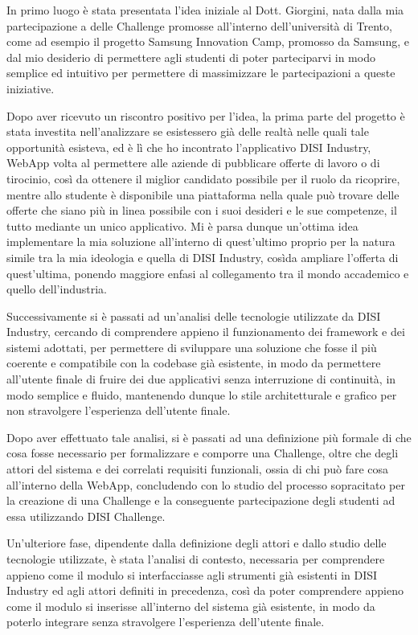 In primo luogo è stata presentata l'idea iniziale al Dott. Giorgini, nata dalla mia partecipazione a delle Challenge promosse all'interno dell'università di Trento, come ad esempio il progetto Samsung Innovation Camp, promosso da Samsung, e dal mio desiderio di permettere agli studenti di poter parteciparvi in modo semplice ed intuitivo per permettere di massimizzare le partecipazioni a queste iniziative.

Dopo aver ricevuto un riscontro positivo per l'idea, la prima parte del progetto è stata investita nell'analizzare se esistessero già delle realtà nelle quali tale opportunità esisteva, ed è lì che ho incontrato l'applicativo DISI Industry, WebApp volta al permettere alle aziende di pubblicare offerte di lavoro o di tirocinio, così da ottenere il miglior candidato possibile per il ruolo da ricoprire, mentre allo studente è disponibile una piattaforma nella quale può trovare delle offerte che siano più in linea possibile con i suoi desideri e le sue competenze, il tutto mediante un unico applicativo. Mi è parsa dunque un'ottima idea implementare la mia soluzione all'interno di quest'ultimo proprio per la natura simile tra la mia ideologia e quella di DISI Industry, cosìda ampliare l'offerta di quest'ultima, ponendo maggiore enfasi al collegamento tra il mondo accademico e quello dell'industria.

Successivamente si è passati ad un'analisi delle tecnologie utilizzate da DISI Industry, cercando di comprendere appieno il funzionamento dei framework e dei sistemi adottati, per permettere di sviluppare una soluzione che fosse il più coerente e compatibile con la codebase già esistente, in modo da permettere all'utente finale di fruire dei due applicativi senza interruzione di continuità, in modo semplice e fluido, mantenendo dunque lo stile architetturale e grafico per non stravolgere l'esperienza dell'utente finale.


Dopo aver effettuato tale analisi, si è passati ad una definizione più formale di che cosa fosse necessario per formalizzare e comporre una Challenge, oltre che degli attori del sistema e dei correlati requisiti funzionali, ossia di chi può fare cosa all'interno della WebApp, concludendo con lo studio del processo sopracitato per la creazione di una Challenge e la conseguente partecipazione degli studenti ad essa utilizzando DISI Challenge.

Un'ulteriore fase, dipendente dalla definizione degli attori e dallo studio delle tecnologie utilizzate, è stata l'analisi di contesto, necessaria per comprendere appieno come il modulo si interfacciasse agli strumenti già esistenti in DISI Industry ed agli attori definiti in precedenza, così da poter comprendere appieno come il modulo si inserisse all'interno del sistema già esistente, in modo da poterlo integrare senza stravolgere l'esperienza dell'utente finale.

